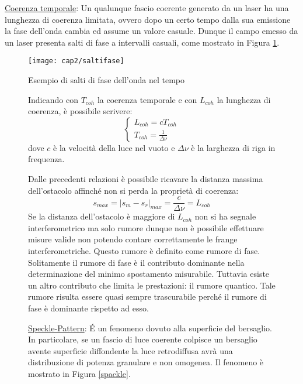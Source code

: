 \begin{itemize}
	\item \underline{Coerenza temporale}: Un qualunque fascio coerente generato da un laser ha una lunghezza di coerenza limitata, ovvero dopo un certo tempo dalla sua emissione la fase dell'onda cambia ed assume un valore casuale. Dunque il campo emesso da un laser presenta salti di fase a intervalli casuali, come mostrato in Figura \ref{saltifase}. 
	
	\begin{figure}[H]
		\begin{center}
			\texttt{[image: cap2/saltifase]}
			\caption{Esempio di salti di fase dell'onda nel tempo}
			\label{saltifase}
		\end{center}
	\end{figure}
	\begin{figure}
	
	Indicando con $T_{coh}$ la coerenza temporale e con $L_{coh}$ la lunghezza di coerenza, è possibile scrivere:
		\begin{equation}
			\begin{cases}
				L_{coh}=cT_{coh}\\T_{coh}=\frac{1}{\Delta \nu}
			\end{cases}
		\end{equation}
		dove $c$ è la velocità della luce nel vuoto e $\Delta \nu$ è la larghezza di riga in frequenza.
		
		Dalle precedenti relazioni è possibile ricavare la distanza massima dell'ostacolo affinché non si perda la proprietà di coerenza:
		\begin{equation}
			s_{max}=|s_m - s_r|_{max}=\frac{c}{\Delta \nu} = L_{coh}
		\end{equation}
		Se la distanza dell'ostacolo è maggiore di $L_{coh}$ non si ha segnale interferometrico ma solo rumore dunque non è possibile effettuare misure valide non potendo contare correttamente le frange interferometriche. Questo rumore è definito come rumore di fase. Solitamente il rumore di fase è il contributo dominante nella determinazione del minimo spostamento misurabile. 
		Tuttavia esiste un altro contributo che limita le prestazioni: il rumore quantico. Tale rumore risulta essere quasi sempre trascurabile perché il rumore di fase è dominante rispetto ad esso.
		
		\item \underline{Speckle-Pattern}: \'E un fenomeno dovuto alla superficie del bersaglio. In particolare, se un fascio di luce coerente colpisce un bersaglio avente superficie diffondente la luce retrodiffusa avrà una distribuzione di potenza granulare e non omogenea. Il fenomeno è mostrato in Figura \ref{spackle}.
		

\end{figure}
\end{itemize}
